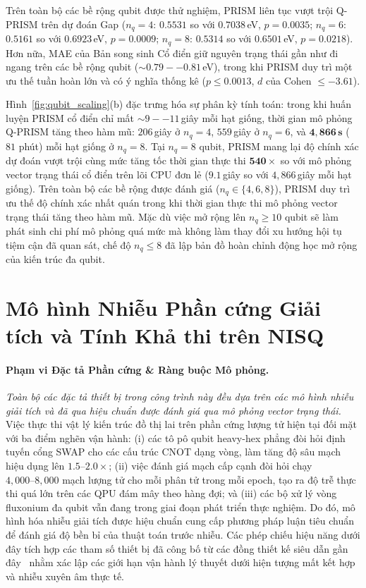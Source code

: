 \documentclass[10pt,twocolumn,letterpaper]{article}
\begin{document}
Trên toàn bộ các bề rộng qubit được thử nghiệm, PRISM liên tục vượt trội Q-PRISM trên dự đoán Gap ($n_q = 4$: $0.5531$ so với $0.7038$\,eV, $p = 0.0035$; $n_q = 6$: $0.5161$ so với $0.6923$\,eV, $p = 0.0009$; $n_q = 8$: $0.5314$ so với $0.6501$\,eV, $p = 0.0218$). Hơn nữa, MAE của Bản song sinh Cổ điển giữ nguyên trạng thái gần như đi ngang trên các bề rộng qubit ($\sim 0.79--0.81$\,eV), trong khi PRISM duy trì một ưu thế tuần hoàn lớn và có ý nghĩa thống kê ($p \le 0.0013$, $d$ của Cohen $\le -3.61$).

Hình~\ref{fig:qubit_scaling}(b) đặc trưng hóa sự phân kỳ tính toán: trong khi huấn luyện PRISM cổ điển chỉ mất $\sim 9--11$\,giây mỗi hạt giống, thời gian mô phỏng Q-PRISM tăng theo hàm mũ: $206$\,giây ở $n_q = 4$, $559$\,giây ở $n_q = 6$, và $\mathbf{4{,}866\,\text{s}}$ (~$81$ phút) mỗi hạt giống ở $n_q = 8$. Tại $n_q = 8$ qubit, PRISM mang lại độ chính xác dự đoán vượt trội cùng mức tăng tốc thời gian thực thi $\mathbf{540\times}$ so với mô phỏng vector trạng thái cổ điển trên lõi CPU đơn lẻ ($9.1$\,giây so với $4{,}866$\,giây mỗi hạt giống). Trên toàn bộ các bề rộng được đánh giá ($n_q \in \{4, 6, 8\}$), PRISM duy trì ưu thế độ chính xác nhất quán trong khi thời gian thực thi mô phỏng vector trạng thái tăng theo hàm mũ. Mặc dù việc mở rộng lên $n_q \ge 10$ qubit sẽ làm phát sinh chi phí mô phỏng quá mức mà không làm thay đổi xu hướng hội tụ tiệm cận đã quan sát, chế độ $n_q \le 8$ đã lập bản đồ hoàn chỉnh động học mở rộng của kiến trúc đa qubit.

\section{Mô hình Nhiễu Phần cứng Giải tích và Tính Khả thi trên NISQ}
\label{sm:analytical_noise_scaling}

\paragraph{Phạm vi Đặc tả Phần cứng \& Ràng buộc Mô phỏng.}
\textit{Toàn bộ các đặc tả thiết bị trong công trình này đều dựa trên các mô hình nhiễu giải tích và đã qua hiệu chuẩn được đánh giá qua mô phỏng vector trạng thái.}
Việc thực thi vật lý kiến trúc đồ thị lai trên phần cứng lượng tử hiện tại đối mặt với ba điểm nghẽn vận hành: (i) các tô pô qubit heavy-hex phẳng đòi hỏi định tuyến cổng SWAP cho các cấu trúc CNOT dạng vòng, làm tăng độ sâu mạch hiệu dụng lên $1.5\text{--}2.0\times$; (ii) việc đánh giá mạch cấp cạnh đòi hỏi chạy $4{,}000\text{--}8{,}000$ mạch lượng tử cho mỗi phân tử trong mỗi epoch, tạo ra độ trễ thực thi quá lớn trên các QPU đám mây theo hàng đợi; và (iii) các bộ xử lý vòng fluxonium đa qubit vẫn đang trong giai đoạn phát triển thực nghiệm. Do đó, mô hình hóa nhiễu giải tích được hiệu chuẩn cung cấp phương pháp luận tiêu chuẩn để đánh giá độ bền bỉ của thuật toán trước nhiễu. Các phép chiếu hiệu năng dưới đây tích hợp các tham số thiết bị đã công bố từ các đồng thiết kế siêu dẫn gần đây~\cite{Kline:2025ecg, ding2023fluxonium, Bao:2021use} nhằm xác lập các giới hạn vận hành lý thuyết dưới hiện tượng mất kết hợp và nhiễu xuyên âm thực tế.
\end{document}
